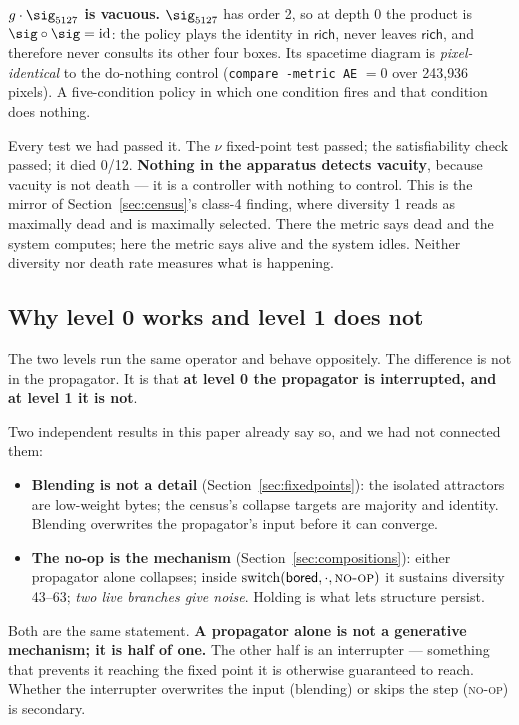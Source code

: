 \textbf{$g \cdot \sig_{5127}$ is vacuous.} $\sig_{5127}$ has order 2, so at depth 0
the product is $\sig \circ \sig = \mathrm{id}$: the policy plays the identity in
$\textsf{rich}$, never leaves $\textsf{rich}$, and therefore never consults its
other four boxes. Its spacetime diagram is \emph{pixel-identical} to the
do-nothing control (\texttt{compare -metric AE} $= 0$ over 243{,}936 pixels). A
five-condition policy in which one condition fires and that condition does nothing.

Every test we had passed it. The $\nu$ fixed-point test passed; the satisfiability
check passed; it died 0/12. \textbf{Nothing in the apparatus detects vacuity},
because vacuity is not death --- it is a controller with nothing to control. This
is the mirror of Section~\ref{sec:census}'s class-4 finding, where diversity 1
reads as maximally dead and is maximally selected. There the metric says dead and
the system computes; here the metric says alive and the system idles. Neither
diversity nor death rate measures what is happening.

\subsection{Why level 0 works and level 1 does not}

The two levels run the same operator and behave oppositely. The difference is not
in the propagator. It is that \textbf{at level 0 the propagator is interrupted,
and at level 1 it is not}.

Two independent results in this paper already say so, and we had not connected
them:
\begin{itemize}
  \item \textbf{Blending is not a detail} (Section~\ref{sec:fixedpoints}): the
        isolated attractors are low-weight bytes; the census's collapse targets are
        majority and identity. Blending overwrites the propagator's input before it
        can converge.
  \item \textbf{The no-op is the mechanism} (Section~\ref{sec:compositions}):
        either propagator alone collapses; inside
        $\mathrm{switch}(\textsf{bored}, \cdot, \textsc{no-op})$ it sustains
        diversity 43--63; \emph{two live branches give noise}. Holding is what lets
        structure persist.
\end{itemize}
Both are the same statement. \textbf{A propagator alone is not a generative
mechanism; it is half of one.} The other half is an interrupter --- something that
prevents it reaching the fixed point it is otherwise guaranteed to reach. Whether
the interrupter overwrites the input (blending) or skips the step (\textsc{no-op})
is secondary.

